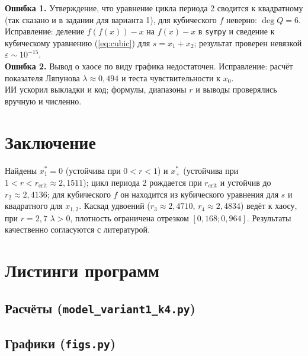 \documentclass[12pt,a4paper]{article}
\newcommand{\rc}{r_{\mathrm{crit}}}
\begin{document}
\textbf{Ошибка 1.} Утверждение, что уравнение цикла периода 2 сводится к квадратному (так сказано и в задании для варианта 1), для кубического $f$ неверно: $\deg Q=6$. Исправление: деление $f(f(x))-x$ на $f(x)-x$ в \texttt{sympy} и сведение к кубическому уравнению (\ref{eq:cubic}) для $s=x_1+x_2$; результат проверен невязкой $\varepsilon\sim10^{-15}$.\\
\textbf{Ошибка 2.} Вывод о хаосе по виду графика недостаточен. Исправление: расчёт показателя Ляпунова $\lambda\approx0{,}494$ и теста чувствительности к $x_0$.\\
ИИ ускорил выкладки и код; формулы, диапазоны $r$ и выводы проверялись вручную и численно.

\section{Заключение}
Найдены $x_1^*=0$ (устойчива при $0<r<1$) и $x^*_+$ (устойчива при $1<r<\rc\approx2{,}1511$); цикл периода 2 рождается при $\rc$ и устойчив до $r_2\approx2{,}4136$; для кубического $f$ он находится из кубического уравнения для $s$ и квадратного для $x_{1,2}$. Каскад удвоений ($r_3\approx2{,}4710$, $r_4\approx2{,}4834$) ведёт к хаосу, при $r=2{,}7$ $\lambda>0$, плотность ограничена отрезком $[0{,}168;0{,}964]$. Результаты качественно согласуются с литературой.

\appendix\section{Листинги программ}
\subsection{Расчёты (\texttt{model\_variant1\_k4.py})}
\subsection{Графики (\texttt{figs.py})}
\end{document}
